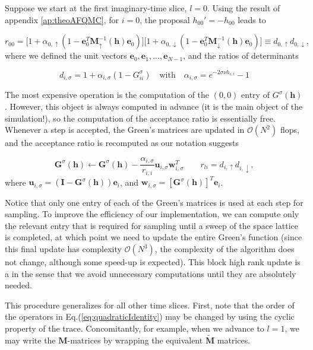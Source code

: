 Suppose we start at the first imaginary-time slice, $l = 0$.
Using the result of appendix \ref{ap:theoAFQMC}, for $i = 0$, the proposal $h_{0 0}' = - h_{0 0}$ leads to

\begin{equation}
r_{0 0} = \bigg[ 1 + \alpha_{0, \uparrow} ( 1 - \bm e_0^T \bm M_\uparrow^{-1} ( \bm h ) \bm e_0 ) \bigg] \bigg[ 1 + \alpha_{0, \downarrow} ( 1 - \bm e_0^T \bm M_\downarrow^{-1} ( \bm h ) \bm e_0 ) \bigg] \equiv d_{0, \uparrow} d_{0, \downarrow} ,
\end{equation}
where we defined the unit vectors $\bm e_0, \bm e_1, ..., \bm e_{N-1}$, and the ratios of determinants

\begin{equation*}
d_{i, \sigma} = 1 + \alpha_{i, \sigma} ( 1 - G^\sigma_{i i} ) \quad \text{with} \quad \alpha_{i, \sigma} = e^{-2 \sigma \nu h_{i, i}} - 1
\end{equation*}

The most expensive operation is the computation of the $(0, 0)$ entry of $G^\sigma (\bm h)$.
However, this object is always computed in advance (it is the main object of the simulation!), so the computation of the acceptance ratio is essentially free.
Whenever a step is accepted, the Green's matrices are updated in $\mathcal{O}(N^2)$ flops, and the acceptance ratio is recomputed as our notation suggests

\begin{equation}
\bm G^\sigma ( \bm h ) \leftarrow \bm G^\sigma ( \bm h ) - \frac{\alpha_{i, \sigma}}{r_{i, i}} \bm u_{i, \sigma} \bm w_{i, \sigma}^T \quad \quad r_{l i} = d_{i, \uparrow} d_{i, \downarrow} ,
\end{equation}
where $\bm u_{i, \sigma} = ( \bm I - \bm G^\sigma ( \bm h ) ) \bm e_i$, and $\bm w_{i, \sigma} = [ \bm G^\sigma (\bm h) ]^T \bm e_i$.

Notice that only one entry of each of the Green's matrices is used at each step for sampling.
To improve the efficiency of our implementation, we can compute only the relevant entry that is required for sampling until a sweep of the space lattice is completed, at which point we need to update the entire Green's function (since this final update has complexity $\mathcal{O}(N^3)$, the complexity of the algorithm does not change, although some speed-up is expected).
This block high rank update is a   in the sense that we avoid unnecessary computations until they are absolutely needed.

This procedure generalizes for all other time slices.
First, note that the order of the operators in Eq.(\ref{eq:quadraticIdentity}) may be changed by using the cyclic property of the trace.
Concomitantly, for example, when we advance to $l = 1$, we may write the $\bm M$-matrices by wrapping the equivalent $\widetilde{\bm M}$ matrices.

